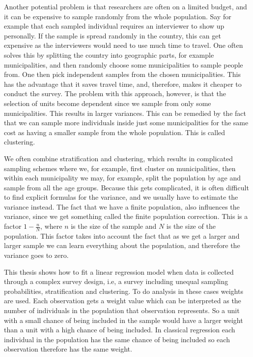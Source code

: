 \documentclass{article}
\begin{document}
Another potential problem is that researchers are often on a limited budget, and
it can be expensive to sample randomly from the whole population. Say
for example that 
each sampled individual requires an interviewer to show up personally. If the sample is spread randomly in the country, this can get
expensive as the interviewers would need to use much time to travel. One often solves
this by splitting the country into geographic parts, for example municipalities, and
then randomly choose some municipalities to sample people from. One then pick
independent samples from the chosen municipalities. This has the advantage that it
saves travel time, and, therefore, makes it cheaper to conduct the
survey. The problem with this approach, however, is that the selection of units become
dependent since we sample from only some municipalities. This results in larger
variances. This can be remedied by the fact that we can sample more
individuals inside just some municipalities for the same
cost as having a smaller sample from the whole
population. This is called clustering.

We often combine stratification and clustering, which results in complicated
sampling schemes where we, for example, first cluster on municipalities, then within
each municipality we may, for example, split the population by age and sample from all
the age groups. Because this gets complicated, it is often difficult to
find explicit formulas for the variance, and we usually have to estimate the variance
instead. 
The fact that we have a finite population, also influences the variance, since we
get something called the finite population correction. This is a factor \(1 -
\frac{n}{N}\), where \(n\) is the size of the sample and \(N\) is the size of
the population. This factor takes into account the fact that as we get a larger
and larger sample we can learn everything about the population, and therefore
the variance goes to zero.

This thesis shows how to fit
a linear regression model when data is collected through a complex survey design, i.e,
a survey including unequal sampling probabilities, stratification and
clustering. To do analysis in these cases weights are used. Each observation gets a weight
value which can be interpreted as the number of individuals in the population
that observation represents. So a unit with a small chance of being
included in the sample would have a larger weight than a unit with a high chance of
being included.
In classical regression each individual in the population has the same chance of
being included so each observation therefore has the same weight.
\end{document}
